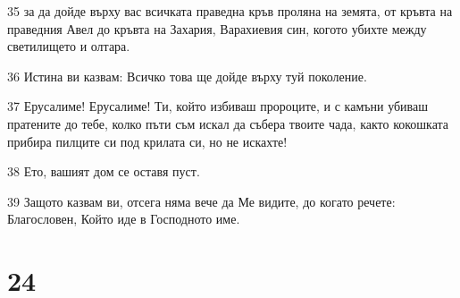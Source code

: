 \par 35 за да дойде върху вас всичката праведна кръв проляна на земята, от кръвта на праведния Авел до кръвта на Захария, Варахиевия син, когото убихте между светилището и олтара.
\par 36 Истина ви казвам: Всичко това ще дойде върху туй поколение.
\par 37 Ерусалиме! Ерусалиме! Ти, който избиваш пророците, и с камъни убиваш пратените до тебе, колко пъти съм искал да събера твоите чада, както кокошката прибира пилците си под крилата си, но не искахте!
\par 38 Ето, вашият дом се оставя пуст.
\par 39 Защото казвам ви, отсега няма вече да Ме видите, до когато речете: Благословен, Който иде в Господното име.

\chapter{24}

